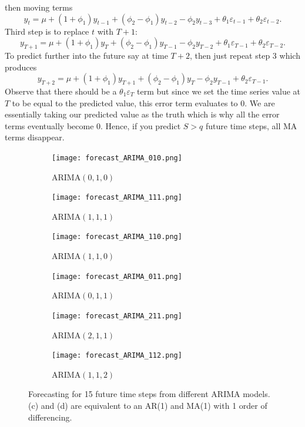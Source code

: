 \documentclass{article}
\begin{document}
  then moving terms
  \begin{equation*}
    y_t = \mu + (1 + \phi_1)y_{t-1} + (\phi_2 - \phi_1)y_{t-2} - \phi_2y_{t-3} + \theta_1\varepsilon_{t-1} + \theta_2\varepsilon_{t-2}.
  \end{equation*}
  Third step is to replace $t$ with $T+1$:
  \begin{equation*}
    y_{T+1} = \mu + (1 + \phi_1)y_{T} + (\phi_2 - \phi_1)y_{T-1} - \phi_2y_{T-2} + \theta_1\varepsilon_{T-1} + \theta_2\varepsilon_{T-2}.
  \end{equation*}
  To predict further into the future say at time $T+2$, then just repeat step 3 which produces
  \begin{equation*}
    y_{T+2} = \mu + (1 + \phi_1)y_{T+1} + (\phi_2 - \phi_1)y_{T} - \phi_2y_{T-1} + \theta_2\varepsilon_{T-1}.
  \end{equation*}
  Observe that there should be a $\theta_1\varepsilon_{T}$ term but since we set the time series value at $T$ to be equal to the predicted value, this error term evaluates to 0. We are essentially taking our predicted value as the truth which is why all the error terms eventually become 0. Hence, if you predict $S > q$ future time steps, all MA terms disappear. 

  \begin{figure}[H]
    \centering
    \captionsetup{justification=centering}
    \begin{subfigure}[b]{0.49\linewidth}
      \texttt{[image: forecast\_ARIMA\_010.png]}
      \caption{ARIMA$(0, 1, 0)$}
    \end{subfigure}
    \begin{subfigure}[b]{0.49\linewidth}
      \texttt{[image: forecast\_ARIMA\_111.png]}
      \caption{ARIMA$(1, 1, 1)$}
    \end{subfigure}
    \begin{subfigure}[b]{0.49\linewidth}
      \texttt{[image: forecast\_ARIMA\_110.png]}
      \caption{ARIMA$(1, 1, 0)$}
    \end{subfigure}
    \begin{subfigure}[b]{0.49\linewidth}
      \texttt{[image: forecast\_ARIMA\_011.png]}
      \caption{ARIMA$(0, 1, 1)$}
    \end{subfigure}
    \begin{subfigure}[b]{0.49\linewidth}
      \texttt{[image: forecast\_ARIMA\_211.png]}
      \caption{ARIMA$(2, 1, 1)$}
    \end{subfigure}
    \begin{subfigure}[b]{0.49\linewidth}
      \texttt{[image: forecast\_ARIMA\_112.png]}
      \caption{ARIMA$(1, 1, 2)$}
    \end{subfigure}
    \caption{Forecasting for 15 future time steps from different ARIMA models. (c) and (d) are equivalent to an AR(1) and MA(1) with 1 order of differencing.}
  \end{figure}
  
\end{document}
